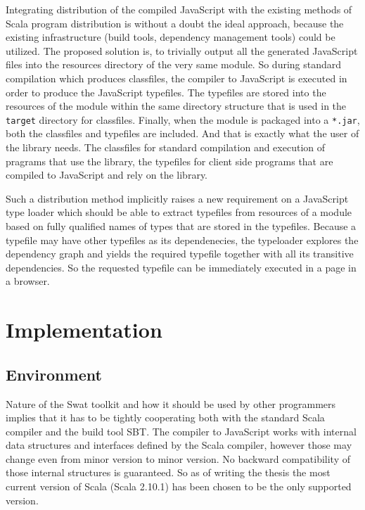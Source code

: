 \documentclass[12pt,a4paper]{report}
\begin{document}
Integrating distribution of the compiled JavaScript with the existing methods of Scala program distribution is without a doubt the ideal approach, because the existing infrastructure (build tools, dependency management tools) could be utilized. The proposed solution is, to trivially output all the generated JavaScript files into the resources directory of the very same module. So during standard compilation which produces classfiles, the compiler to JavaScript is executed in order to produce the JavaScript typefiles. The typefiles are stored into the resources of the module within the same directory structure that is used in the \texttt{target} directory for classfiles. Finally, when the module is packaged into a \texttt{*.jar}, both the classfiles and typefiles are included. And that is exactly what the user of the library needs. The classfiles for standard compilation and execution of pragrams that use the library, the typefiles for client side programs that are compiled to JavaScript and rely on the library.

Such a distribution method implicitly raises a new requirement on a JavaScript type loader which should be able to extract typefiles from resources of a module based on fully qualified names of types that are stored in the typefiles. Because a typefile may have other typefiles as its dependenecies, the typeloader explores the dependency graph and yields the required typefile together with all its transitive dependencies. So the requested typefile can be immediately executed in a page in a browser.



\chapter{Implementation}

\section{Environment}

Nature of the Swat toolkit and how it should be used by other programmers implies that it has to be tightly cooperating both with the standard Scala compiler and the build tool SBT. The compiler to JavaScript works with internal data structures and interfaces defined by the Scala compiler, however those may change even from minor version to minor version. No backward compatibility of those internal structures is guaranteed. So as of writing the thesis the most current version of Scala (Scala 2.10.1) has been chosen to be the only supported version. 
\end{document}
